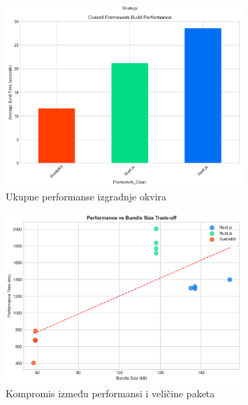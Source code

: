 \begin{figure}[H]
    \centering
    \includegraphics[width=0.8\textwidth]{slike/rezultati/dodatne-metrike/overall_framework_build_performance.png}
    \caption{Ukupne performanse izgradnje okvira}
    \label{fig:overall_framework_build_performance}
\end{figure}

\begin{figure}[H]
    \centering
    \includegraphics[width=0.8\textwidth]{slike/rezultati/dodatne-metrike/performance_vs_bundle_size_tradeoff.png}
    \caption{Kompromis između performansi i veličine paketa}
    \label{fig:performance_vs_bundle_size_tradeoff}
\end{figure}
